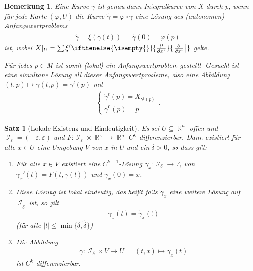 \documentclass[paper=A4, twoside, chapterprefix=true, bibliography=totoc, headsepline]{scrbook}
\let\temp\phi{}
\let\phi\varphi{}
\let\varphi\temp{}
\let\temp\theta{}
\let\theta\vartheta{}
\let\vartheta\temp{}
\let\temp\epsilon{}
\let\epsilon\varepsilon{}
\let\varepsilon\temp{}
\let\temp\rho{}
\let\rho\varrho{}
\let\varrho\temp{}
\DeclareMathOperator{\R}{\mathbb{R}}
\DeclareMathOperator{\calI}{\mathcal{I}}
\newcommand{\pdifffrac}[3][]{\ifthenelse{\isempty{#1}}{\frac{\partial #2}{\partial #3}}{\left. \frac{\partial #2}{\partial #3} \right|_{#1}}}
\theoremstyle{plain}
\newtheorem{Satz}[Dfn]{Satz}
\theoremstyle{nonumberplain}
\newtheorem{bem}{Bemerkung}
\theoremstyle{empty}
\theoremstyle{break}
\newcommand{\quot}[1]{\textrm{\glqq}{#1}\textrm{\grqq}}
\begin{document}
\begin{bem}
  Eine Kurve $\gamma$ ist genau dann Integralkurve von $X$ durch $p$, wenn f\"ur jede Karte $(\phi,U)$ die Kurve $\tilde \gamma = \phi \circ \gamma$ eine L\"osung des (autonomen) Anfangswertproblems
  \begin{align*}
    \dot{\tilde \gamma} = \xi(\gamma(t)) && \tilde \gamma(0) = \phi(p)
  \end{align*}
  ist, wobei $X|_U = \sum \xi^i \pdifffrac{}{x^i}$ gelte.

  F\"ur jedes $p \in M$ ist somit (lokal) ein Anfangswertproblem gestellt.
  Gesucht ist eine \quot{simultane} L\"osung all dieser Anfangswertprobleme, also eine Abbildung $(t,p) \mapsto \gamma(t,p) = \gamma^t(p)$ mit 
  \begin{align*}
    \begin{cases}
      \dot \gamma^t(p) = X_{\gamma^t(p)}\\
      \gamma^0(p) = p
    \end{cases}.
  \end{align*}
\end{bem}

\begin{Satz}[Lokale Existenz und Eindeutigkeit]\label{satz-4-6}
  Es sei $U \subseteq \R^n$ offen und $\calI_{\epsilon}=(-\epsilon,\epsilon)$ und $F \colon \calI_{\epsilon} \times \R^n \to \R^n$ $C^k$-differenzierbar.
  Dann existiert f\"ur alle $x \in U$ eine Umgebung $V$ von $x$ in $U$ und ein $\delta > 0$, so dass gilt:
  \begin{enumerate}[label=(\roman*),leftmargin=*,widest=iii]
  \item F\"ur alle $x \in V$ existiert eine $C^{k+1}$-L\"osung $\gamma_x\colon \calI_{\delta} \to V$, von $\gamma_x'(t)=F(t,\gamma(t))$ und $\gamma_x(0) = x$.
  \item\label{satz-4-6-ii} Diese L\"osung ist lokal eindeutig, das hei\ss t falls $\tilde \gamma_x$ eine weitere L\"osung auf $\calI_{\tilde\delta}$ ist, so gilt
    \begin{align*}
      \gamma_x(t) = \tilde \gamma_x(t)
    \end{align*}
    (f\"ur alle $|t| \leq \min\{\delta, \tilde\delta\}$)
  \item Die Abbildung 
    \begin{align*}
      \gamma\colon \calI_{\delta} \times V \to U && (t,x) \mapsto \gamma_x(t)
    \end{align*}
    ist $C^k$-differenzierbar.
  \end{enumerate}
\end{Satz}
\end{document}
